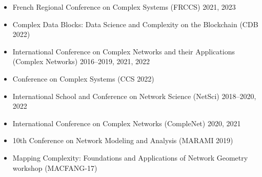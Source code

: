 \documentclass[11pt]{article}
\begin{document}
\begin{itemize}\small
  \item French Regional Conference on Complex Systems (FRCCS) 2021, 2023
  \item Complex Data Blocks: Data Science and Complexity on the Blockchain (CDB 2022)
  \item International Conference on Complex Networks and their Applications (Complex Networks) 2016--2019, 2021, 2022
  \item Conference on Complex Systems (CCS 2022)
  \item International School and Conference on Network Science (NetSci) 2018--2020, 2022
  \item International Conference on Complex Networks (CompleNet) 2020, 2021
  \item 10th Conference on Network Modeling and Analysis (MARAMI 2019)
  \item Mapping Complexity: Foundations and Applications of Network Geometry workshop (MACFANG-17)
\end{itemize}
\end{document}
